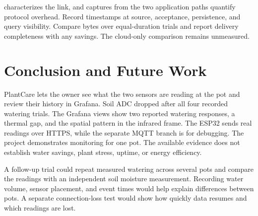  characterizes the link, and captures from the two application paths quantify protocol overhead. Record timestamps at source, acceptance, persistence, and query visibility. Compare bytes over equal-duration trials and report delivery completeness with any savings. The cloud-only comparison remains unmeasured.

\section{Conclusion and Future Work}
PlantCare lets the owner see what the two sensors are reading at the pot and review their history in Grafana. Soil ADC dropped after all four recorded watering trials. The Grafana views show two reported watering responses, a thermal gap, and the spatial pattern in the infrared frame. The ESP32 sends real readings over HTTPS, while the separate MQTT branch is for debugging. The project demonstrates monitoring for one pot. The available evidence does not establish water savings, plant stress, uptime, or energy efficiency.

A follow-up trial could repeat measured watering across several pots and compare the readings with an independent soil moisture measurement. Recording water volume, sensor placement, and event times would help explain differences between pots. A separate connection-loss test would show how quickly data resumes and which readings are lost.

